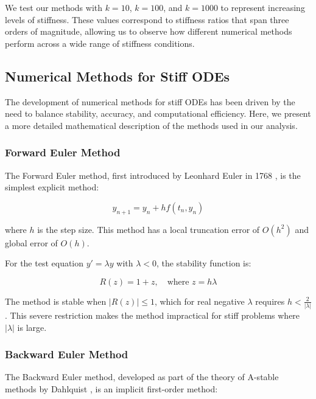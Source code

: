 \documentclass[11pt,a4paper]{article}
\begin{document}
We test our methods with $k = 10$, $k = 100$, and $k = 1000$ to represent increasing levels of stiffness. These values correspond to stiffness ratios that span three orders of magnitude, allowing us to observe how different numerical methods perform across a wide range of stiffness conditions.

\subsection{Numerical Methods for Stiff ODEs}

The development of numerical methods for stiff ODEs has been driven by the need to balance stability, accuracy, and computational efficiency. Here, we present a more detailed mathematical description of the methods used in our analysis.

\subsubsection{Forward Euler Method}

The Forward Euler method, first introduced by Leonhard Euler in 1768 \cite{euler1768institutionum}, is the simplest explicit method:

\begin{equation}
y_{n+1} = y_n + h f(t_n, y_n)
\end{equation}

where $h$ is the step size. This method has a local truncation error of $O(h^2)$ and global error of $O(h)$.

For the test equation $y' = \lambda y$ with $\lambda < 0$, the stability function is:

\begin{equation}
R(z) = 1 + z, \quad \text{where } z = h\lambda
\end{equation}

The method is stable when $|R(z)| \leq 1$, which for real negative $\lambda$ requires $h < \frac{2}{|\lambda|}$. This severe restriction makes the method impractical for stiff problems where $|\lambda|$ is large.

\subsubsection{Backward Euler Method}

The Backward Euler method, developed as part of the theory of A-stable methods by Dahlquist \cite{dahlquist1963special}, is an implicit first-order method:
\end{document}
